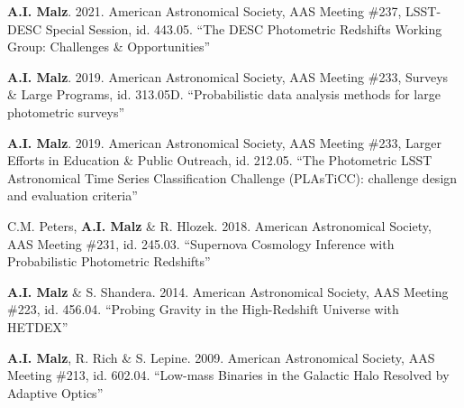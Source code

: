 \begin{list}{}{\malzlist}
\item {\bf A.I. Malz}. 2021. American Astronomical Society, AAS Meeting \#237, LSST-DESC Special Session, id. 443.05. ``The DESC Photometric Redshifts Working Group: Challenges \& Opportunities'' 

\item {\bf A.I. Malz}. 2019. American Astronomical Society, AAS Meeting \#233, Surveys \& Large Programs, id. 313.05D. ``Probabilistic data analysis methods for large photometric surveys'' 
%
\item {\bf A.I. Malz}. 2019. American Astronomical Society, AAS Meeting \#233, Larger Efforts in Education \& Public Outreach, id. 212.05. ``The Photometric LSST Astronomical Time Series Classification Challenge (PLAsTiCC): challenge design and evaluation criteria” 

\item C.M. Peters, {\bf A.I. Malz} \& R. Hlozek. 2018. American Astronomical Society, AAS Meeting \#231, id. 245.03. ``Supernova Cosmology Inference with Probabilistic Photometric Redshifts'' 

\item {\bf A.I. Malz} \& S. Shandera. 2014. American Astronomical Society, AAS Meeting \#223, id. 456.04. ``Probing Gravity in the High-Redshift Universe with HETDEX'' 

\item {\bf A.I. Malz}, R. Rich \& S. Lepine. 2009. American Astronomical Society, AAS Meeting \#213, id. 602.04. ``Low-mass Binaries in the Galactic Halo Resolved by Adaptive Optics'' 
\end{list}
